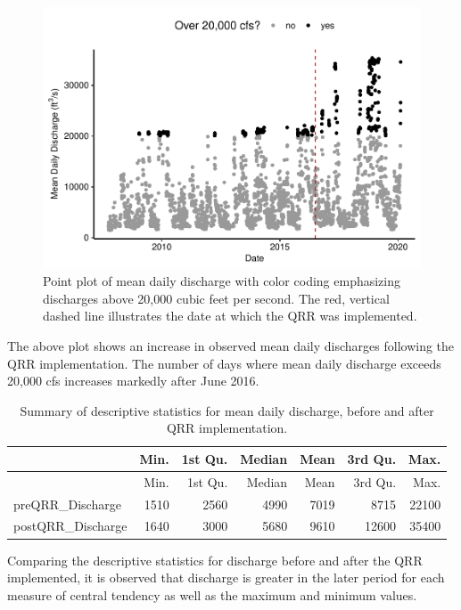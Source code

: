 \documentclass[12pt,]{article}
\begin{document}
\begin{figure}
\centering
\includegraphics{Project_Template_files/figure-latex/unnamed-chunk-2-1.pdf}
\caption{Point plot of mean daily discharge with color coding
emphasizing discharges above 20,000 cubic feet per second. The red,
vertical dashed line illustrates the date at which the QRR was
implemented.}
\end{figure}

The above plot shows an increase in observed mean daily discharges
following the QRR implementation. The number of days where mean daily
discharge exceeds 20,000 cfs increases markedly after June 2016.

\begin{longtable}[]{@{}lrrrrrr@{}}
\caption{Summary of descriptive statistics for mean daily discharge,
before and after QRR implementation.}\tabularnewline
\toprule
& Min. & 1st Qu. & Median & Mean & 3rd Qu. & Max.\tabularnewline
\midrule
\endfirsthead
\toprule
& Min. & 1st Qu. & Median & Mean & 3rd Qu. & Max.\tabularnewline
\midrule
\endhead
preQRR\_Discharge & 1510 & 2560 & 4990 & 7019 & 8715 &
22100\tabularnewline
postQRR\_Discharge & 1640 & 3000 & 5680 & 9610 & 12600 &
35400\tabularnewline
\bottomrule
\end{longtable}

Comparing the descriptive statistics for discharge before and after the
QRR implemented, it is observed that discharge is greater in the later
period for each measure of central tendency as well as the maximum and
minimum values.
\end{document}

